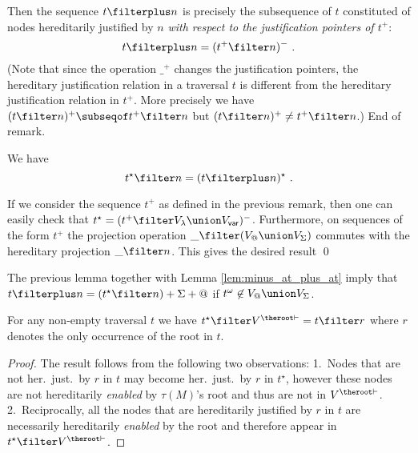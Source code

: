 \begin{remark}
Then the sequence $t \filterplus n$ is precisely the subsequence of
$t$ constituted of nodes hereditarily justified by $n$ \emph{with
respect to the justification pointers of $t^+$}:
$$t \filterplus n = (t^+ \filter n)^- \ .$$
(Note that since the operation $\_^+$ changes the justification
pointers, the hereditary justification relation in a traversal $t$
is different from the hereditary justification relation in $t^+$.
More precisely we have $(t\filter n)^+ \subseqof t^+ \filter n$ but
$(t\filter n)^+ \neq t^+ \filter n$.)
End of remark.
\end{remark}
\bigskip

\begin{lemma}
\label{lem:tstarproj_eq_tprojplusstar} We have
\begin{equation*}
t^\star \filter n = (t\filterplus n)^\star \ .
\end{equation*}
\end{lemma}
\proof {}

If we consider the sequence $t^+$ as defined in the previous remark,
then one can easily check that $t^\star = (t^+ \filter V_\lambda
\union V_{\sf var})^-$. Furthermore, on sequences of the form $t^+$
the projection operation $\_ \filter (V_@\union V_\Sigma)$ commutes
with the hereditary projection $\_ \filter n$. This gives the
desired result \qed

The previous lemma together with Lemma \ref{lem:minus_at_plus_at}
imply that $t \filterplus n = (t^\star\filter n) +\Sigma+@$ if
$t^\omega \not\in V_@ \union V_\Sigma$.



\begin{lemma}
\label{lem:he_proj_root_is_hj_proj_r} For any non-empty traversal
$t$ we have  $t^\star\filter V^{\theroot\vdash} = t \filter r$ where
$r$ denotes the only occurrence of the root in $t$.
\end{lemma}
\begin{proof}
The result follows from the following two observations:
1.\ Nodes that are not her.\ just.\ by $r$ in $t$ may become
her.\ just.\ by $r$ in $t^\star$, however these nodes are not hereditarily \emph{enabled}
 by $\tau(M)$'s root and thus are not in $V^{\theroot\vdash}$.
2.\ Reciprocally, all the nodes that are hereditarily justified by $r$ in $t$ are necessarily
hereditarily \emph{enabled} by the root and therefore appear in $t^\star \filter V^{\theroot\vdash}$.
\end{proof}


